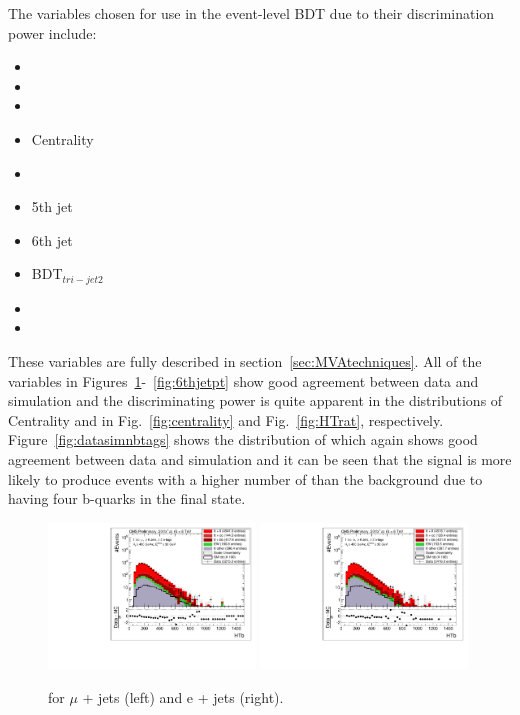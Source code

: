 The variables chosen for use in the event-level BDT due to their discrimination power include:
\begin{multicols}{2}
\begin{itemize}
\item \njets
\item \nMtags
\item \HTb
\item Centrality
\item \HTrat
\item 5th jet \pt
\item 6th jet \pt
\item BDT$_{tri-jet2}$
\item \sumjetmassX
\item \HTX
\end{itemize}
\end{multicols}
These variables are fully described in section~\ref{sec:MVAtechniques}. All of the variables in Figures~\ref{fig:HTb}-~\ref{fig:6thjetpt} show good agreement between data and simulation and the discriminating power is quite apparent in the distributions of Centrality and \HTrat in Fig.~\ref{fig:centrality} and Fig.~\ref{fig:HTrat}, respectively. Figure~\ref{fig:datasimnbtags} shows the distribution of \nMtags which again shows good agreement between data and simulation and it can be seen that the \tttt signal is more likely to produce events with a higher number of \nMtags than the background due to having four b-quarks in the final state.


\begin{figure}[!ht]
    \includegraphics[clip, trim=0.15cm 0.15cm 0.15cm 0.1cm, width=0.49\textwidth]{images/Run1/HTb_SelectedJets_StackLogY_Mu.pdf}
    \includegraphics[clip, trim=0.15cm 0.15cm 0.15cm 0.1cm, width=0.49\textwidth]{images/Run1/HTb_SelectedJets_StackLogY_e.pdf}
    \caption{\HTb for $\mu$ + jets (left) and e + jets (right).}
    \label{fig:HTb}
\end{figure}

